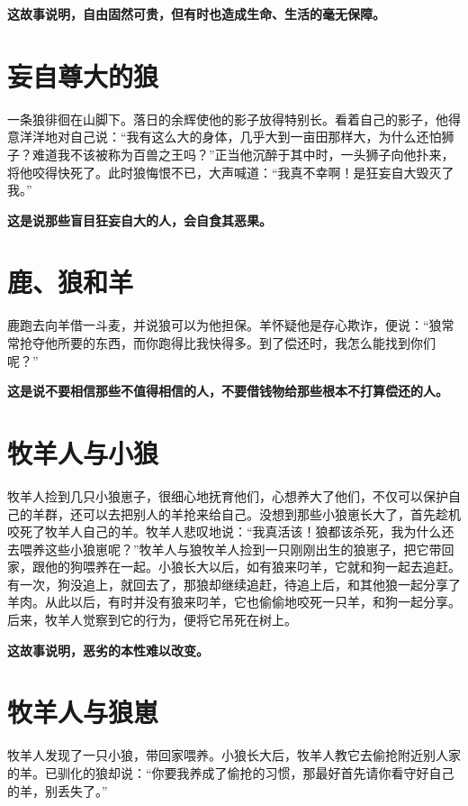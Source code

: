 {\bfseries \color{red}这故事说明，自由固然可贵，但有时也造成生命、生活的毫无保障。}

\section{妄自尊大的狼}

一条狼徘徊在山脚下。落日的余辉使他的影子放得特别长。看着自己的影子，他得意洋洋地对自己说：“我有这么大的身体，几乎大到一亩田那样大，为什么还怕狮子？难道我不该被称为百兽之王吗？”正当他沉醉于其中时，一头狮子向他扑来，将他咬得快死了。此时狼悔恨不已，大声喊道：“我真不幸啊！是狂妄自大毁灭了我。”

{\bfseries \color{red}这是说那些盲目狂妄自大的人，会自食其恶果。}

\section{鹿、狼和羊}

鹿跑去向羊借一斗麦，并说狼可以为他担保。羊怀疑他是存心欺诈，便说：“狼常常抢夺他所要的东西，而你跑得比我快得多。到了偿还时，我怎么能找到你们呢？”

{\bfseries \color{red}这是说不要相信那些不值得相信的人，不要借钱物给那些根本不打算偿还的人。}

\section{牧羊人与小狼}

牧羊人捡到几只小狼崽子，很细心地抚育他们，心想养大了他们，不仅可以保护自己的羊群，还可以去把别人的羊抢来给自己。没想到那些小狼崽长大了，首先趁机咬死了牧羊人自己的羊。牧羊人悲叹地说：“我真活该！狼都该杀死，我为什么还去喂养这些小狼崽呢？”牧羊人与狼牧羊人捡到一只刚刚出生的狼崽子，把它带回家，跟他的狗喂养在一起。小狼长大以后，如有狼来叼羊，它就和狗一起去追赶。有一次，狗没追上，就回去了，那狼却继续追赶，待追上后，和其他狼一起分享了羊肉。从此以后，有时并没有狼来叼羊，它也偷偷地咬死一只羊，和狗一起分享。后来，牧羊人觉察到它的行为，便将它吊死在树上。

{\bfseries \color{red}这故事说明，恶劣的本性难以改变。}

\section{牧羊人与狼崽}

牧羊人发现了一只小狼，带回家喂养。小狼长大后，牧羊人教它去偷抢附近别人家的羊。已驯化的狼却说：“你要我养成了偷抢的习惯，那最好首先请你看守好自己的羊，别丢失了。”

